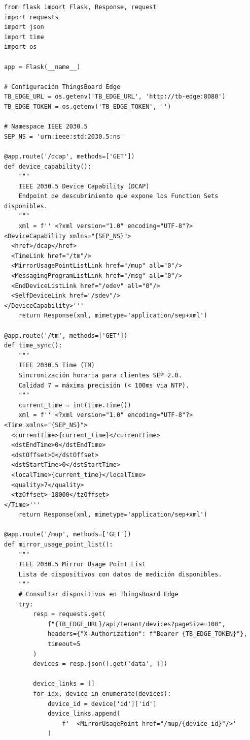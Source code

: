 \begin{verbatim}
from flask import Flask, Response, request
import requests
import json
import time
import os

app = Flask(__name__)

# Configuración ThingsBoard Edge
TB_EDGE_URL = os.getenv('TB_EDGE_URL', 'http://tb-edge:8080')
TB_EDGE_TOKEN = os.getenv('TB_EDGE_TOKEN', '')

# Namespace IEEE 2030.5
SEP_NS = 'urn:ieee:std:2030.5:ns'

@app.route('/dcap', methods=['GET'])
def device_capability():
    """
    IEEE 2030.5 Device Capability (DCAP)
    Endpoint de descubrimiento que expone los Function Sets disponibles.
    """
    xml = f'''<?xml version="1.0" encoding="UTF-8"?>
<DeviceCapability xmlns="{SEP_NS}">
  <href>/dcap</href>
  <TimeLink href="/tm"/>
  <MirrorUsagePointListLink href="/mup" all="0"/>
  <MessagingProgramListLink href="/msg" all="0"/>
  <EndDeviceListLink href="/edev" all="0"/>
  <SelfDeviceLink href="/sdev"/>
</DeviceCapability>'''
    return Response(xml, mimetype='application/sep+xml')

@app.route('/tm', methods=['GET'])
def time_sync():
    """
    IEEE 2030.5 Time (TM)
    Sincronización horaria para clientes SEP 2.0.
    Calidad 7 = máxima precisión (< 100ms via NTP).
    """
    current_time = int(time.time())
    xml = f'''<?xml version="1.0" encoding="UTF-8"?>
<Time xmlns="{SEP_NS}">
  <currentTime>{current_time}</currentTime>
  <dstEndTime>0</dstEndTime>
  <dstOffset>0</dstOffset>
  <dstStartTime>0</dstStartTime>
  <localTime>{current_time}</localTime>
  <quality>7</quality>
  <tzOffset>-18000</tzOffset>
</Time>'''
    return Response(xml, mimetype='application/sep+xml')

@app.route('/mup', methods=['GET'])
def mirror_usage_point_list():
    """
    IEEE 2030.5 Mirror Usage Point List
    Lista de dispositivos con datos de medición disponibles.
    """
    # Consultar dispositivos en ThingsBoard Edge
    try:
        resp = requests.get(
            f"{TB_EDGE_URL}/api/tenant/devices?pageSize=100",
            headers={"X-Authorization": f"Bearer {TB_EDGE_TOKEN}"},
            timeout=5
        )
        devices = resp.json().get('data', [])
        
        device_links = []
        for idx, device in enumerate(devices):
            device_id = device['id']['id']
            device_links.append(
                f'  <MirrorUsagePoint href="/mup/{device_id}"/>'
            )
        

\end{verbatim}
